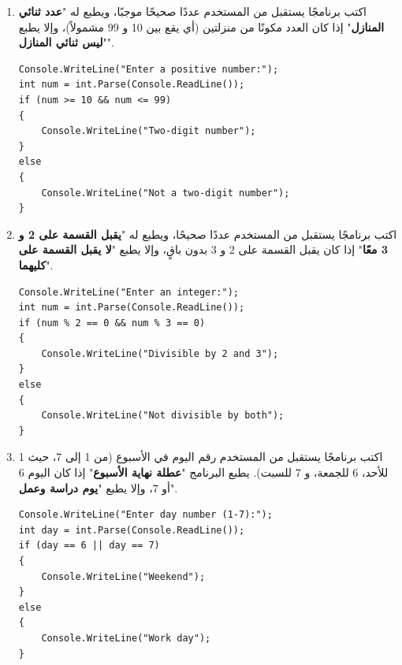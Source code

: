 \documentclass[14pt]{extarticle}
\begin{document}
\begin{enumerate}[resume, itemsep=2em]
\filbreak
\item
اكتب برنامجًا يستقبل من المستخدم عددًا صحيحًا موجبًا، ويطبع له "\textbf{عدد ثنائي المنازل}" إذا كان العدد مكونًا من منزلتين (أي يقع بين 10 و 99 مشمولاً)، وإلا يطبع "\textbf{ليس ثنائي المنازل}".
\ifwithsols
\begin{boxSolution}
\begin{english}
\begin{verbatim}
Console.WriteLine("Enter a positive number:");
int num = int.Parse(Console.ReadLine());
if (num >= 10 && num <= 99)
{
    Console.WriteLine("Two-digit number");
}
else
{
    Console.WriteLine("Not a two-digit number");
}
\end{verbatim}
\end{english}
\end{boxSolution}
\fi

\filbreak
\item
اكتب برنامجًا يستقبل من المستخدم عددًا صحيحًا، ويطبع له "\textbf{يقبل القسمة على 2 و 3 معًا}" إذا كان يقبل القسمة على 2 و 3 بدون باقٍ، وإلا يطبع "\textbf{لا يقبل القسمة على كليهما}".
\ifwithsols
\begin{boxSolution}
\begin{english}
\begin{verbatim}
Console.WriteLine("Enter an integer:");
int num = int.Parse(Console.ReadLine());
if (num % 2 == 0 && num % 3 == 0)
{
    Console.WriteLine("Divisible by 2 and 3");
}
else
{
    Console.WriteLine("Not divisible by both");
}
\end{verbatim}
\end{english}
\end{boxSolution}
\fi

\filbreak
\item
اكتب برنامجًا يستقبل من المستخدم رقم اليوم في الأسبوع (من 1 إلى 7، حيث 1 للأحد، 6 للجمعة، و 7 للسبت). يطبع البرنامج "\textbf{عطلة نهاية الأسبوع}" إذا كان اليوم 6 أو 7، وإلا يطبع "\textbf{يوم دراسة وعمل}".
\ifwithsols
\begin{boxSolution}
\begin{english}
\begin{verbatim}
Console.WriteLine("Enter day number (1-7):");
int day = int.Parse(Console.ReadLine());
if (day == 6 || day == 7)
{
    Console.WriteLine("Weekend");
}
else
{
    Console.WriteLine("Work day");
}
\end{verbatim}
\end{english}
\end{boxSolution}
\fi


\end{enumerate}
\end{document}
